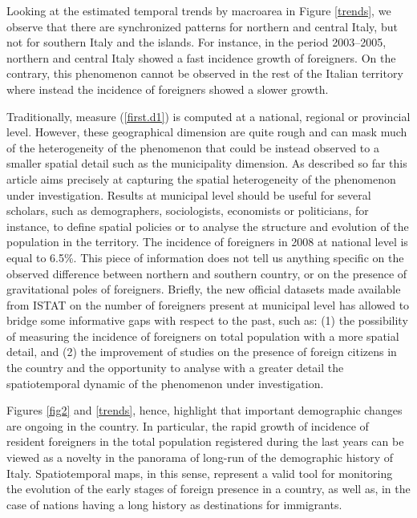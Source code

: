 \documentclass[10pt]{article}
\theoremstyle{definition}
\theoremstyle{plain}
\begin{document}
Looking at the estimated temporal trends by macroarea in Figure \ref{trends}, we observe that there are synchronized patterns for northern and central Italy, but not for southern Italy and the islands. For instance, in the period 2003--2005, northern and central Italy showed a fast incidence growth of foreigners. On the contrary, this phenomenon cannot be observed in the rest of the Italian territory where instead the incidence of foreigners showed a slower growth. 

Traditionally, measure (\ref{first.d1}) is computed at a national, regional or provincial level. However, these geographical dimension are quite rough and can mask much of the heterogeneity of the phenomenon that could be instead observed to a smaller spatial detail such as the municipality dimension. As described so far this article aims precisely at capturing the spatial heterogeneity of the phenomenon under investigation. Results at municipal level should be useful for several scholars, such as demographers, sociologists, economists or politicians, for instance, to define spatial policies or to analyse the structure and evolution of the population in the territory. The incidence of foreigners in 2008 at national level is equal to 6.5\%. This piece of information does not tell us anything specific on the observed difference between northern and southern country, or on the presence of gravitational poles of foreigners. Briefly, the new official datasets made available from ISTAT on the number of foreigners present at municipal level has allowed to bridge some informative gaps with respect to the past, such as: (1) the possibility of measuring the incidence of foreigners on total population with a more spatial detail, and (2) the improvement of studies on the presence of foreign citizens in the country and the opportunity to analyse with a greater detail the spatiotemporal dynamic of the phenomenon under investigation.

Figures \ref{fig2} and \ref{trends}, hence, highlight that important demographic changes are ongoing in the country. In particular, the rapid growth of incidence of resident foreigners in the total population registered during the last years can be viewed as a novelty in the panorama of long-run of the demographic history of Italy. Spatiotemporal maps, in this sense, represent a valid tool for monitoring the evolution of the early stages of foreign presence in a country, as well as, in the case of nations having a long history as destinations for immigrants.
\end{document}
